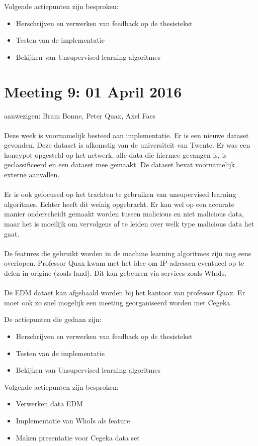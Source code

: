 Volgende actiepunten zijn besproken:
\begin{itemize}  		
		\item Herschrijven en verwerken van feedback op de thesistekst 
        \item Testen van de implementatie
        \item Bekijken van Unsupervised learning algoritmes
\end{itemize}
\section{Meeting 9: 01 April 2016}
aanwezigen: Bram Bonne, Peter Quax, Axel Faes\\\\
Deze week is voornamelijk besteed aan implementatie. Er is een nieuwe dataset gevonden. Deze dataset is afkomstig van de universiteit van Twente. Er was een honeypot opgesteld op het netwerk, alle data die hiermee gevangen is, is geclassificeerd en een dataset mee gemaakt. De dataset bevat voornamelijk externe aanvallen. \\\\
Er is ook gefocused op het trachten te gebruiken van unsupervised learning algoritmes. Echter heeft dit weinig opgebracht. Er kan wel op een accurate manier onderscheidt gemaakt worden tussen malicious en niet malicious data, maar het is moeilijk om vervolgens af te leiden over welk type malicious data het gaat. \\\\
De features die gebruikt worden in de machine learning algoritmes zijn nog eens overlopen. Professor Quax kwam met het idee om IP-adressen eventueel op te delen in origine (zoals land). Dit kan gebeuren via services zoals WhoIs. \\\\
De EDM dataet kan afgehaald worden bij het kantoor van professor Quax. Er moet ook zo snel mogelijk een meeting georganiseerd worden met Cegeka.

De actiepunten die gedaan zijn:
\begin{itemize}  
		\item Herschrijven en verwerken van feedback op de thesistekst 
        \item Testen van de implementatie
        \item Bekijken van Unsupervised learning algoritmes
\end{itemize}

Volgende actiepunten zijn besproken:
\begin{itemize}  		
		\item Verwerken data EDM
		\item Implementatie van WhoIs als feature
       \item Maken presentatie voor Cegeka data set
\end{itemize}
